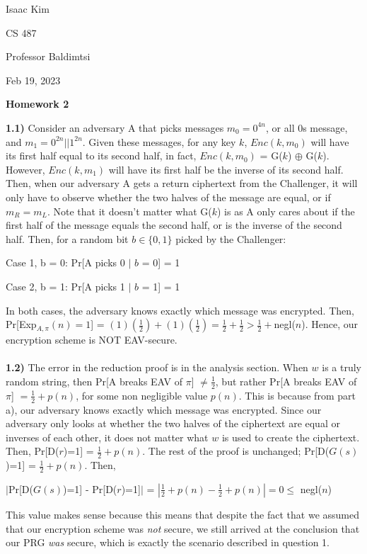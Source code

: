 \documentclass[12pt]{article}
\begin{document}
\noindent Isaac Kim

\noindent CS 487

\noindent Professor Baldimtsi

\noindent Feb 19, 2023

\begin{center} 
\textbf{Homework 2}
\end{center}

\noindent \textbf{1.1)} Consider an adversary A that picks messages $m_0 = 0^{4n}$, or all 0s message, and $m_1 = 0^{2n}||1^{2n}$. Given these messages, for any key $k$, $Enc(k,m_0)$ will have its first half equal to its second half, in fact, $Enc(k,m_0)$ = G($k$) $\oplus$ G($k$). However, $Enc(k,m_1)$ will have its first half be the inverse of its second half. Then, when our adversary A gets a return ciphertext from the Challenger, it will only have to observe whether the two halves of the message are equal, or if $m_R = m_L$. Note that it doesn't matter what G($k$) is as A only cares about if the first half of the message equals the second half, or is the inverse of the second half. Then, for a random bit $b \in \{0,1\}$ picked by the Challenger:
\begin{center}
Case 1, b = 0: Pr[A picks 0 $|$ $b$ = 0] = 1

Case 2, b = 1: Pr[A picks 1 $|$ $b$ = 1] = 1
\end{center}
In both cases, the adversary knows exactly which message was encrypted. Then, Pr[Exp$_{A,\pi}(n) = 1$] = $(1)(\frac{1}{2}) + (1)(\frac{1}{2}) = \frac{1}{2} + \frac{1}{2} > \frac{1}{2} + $negl($n$). Hence, our encryption scheme is NOT EAV-secure.
\\
\\
\noindent \textbf{1.2)} The error in the reduction proof is in the analysis section. When $w$ is a truly random string, then Pr[A breaks EAV of $\pi$] $\neq \frac{1}{2}$, but rather Pr[A breaks EAV of $\pi$] $= \frac{1}{2} + p(n)$, for some non negligible value $p(n)$. This is because from part a), our adversary knows exactly which message was encrypted. Since our adversary only looks at whether the two halves of the ciphertext are equal or inverses of each other, it does not matter what $w$ is used to create the ciphertext. Then, Pr[D($r$)=1] = $\frac{1}{2} + p(n)$. The rest of the proof is unchanged; Pr[D($G(s)$)=1] = $\frac{1}{2} + p(n)$. Then,
\begin{center}
$|$Pr[D($G(s)$)=1] - Pr[D($r$)=1]$|$ = $|\frac{1}{2} + p(n) - \frac{1}{2} + p(n)| = 0 \leq$ negl($n$)
\end{center}
This value makes sense because this means that despite the fact that we assumed that our encryption scheme was \emph{not} secure, we still arrived at the conclusion that our PRG \emph{was} secure, which is exactly the scenario described in question 1.
\\
\\
\end{document}
